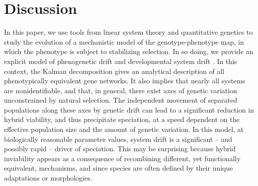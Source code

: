 \documentclass{article}
\newcommand{\1}{\mathbbm{1}}
\begin{document}
\section*{Discussion}


In this paper, we use tools from linear system theory and quantitative genetics
to study the evolution of a mechanistic model of the genotype-phenotype map, 
in which the phenotype is subject to stabilizing selection.
In so doing, we provide an explicit model of
phenogenetic drift \citep{weiss2000phenogenetic} and developmental system drift \citep{true2001developmental}.
In this context, the Kalman decomposition \citep{kalman1963mathematical}
gives an analytical description of all phenotypically equivalent gene networks.
It also implies that nearly all systems are nonidentifiable,
and that, in general, there exist axes of genetic variation unconstrained by natural selection.
The independent movement of separated populations along these axes by genetic drift
can lead to a significant reduction in hybrid viability, and thus precipitate speciation,
at a speed dependent on the effective population size and the amount of genetic variation. 
In this model, at biologically reasonable parameter values,
system drift is a significant -- and possibly rapid -- driver of speciation.
This may be surprising because
hybrid inviability appears as a consequence of recombining different, yet functionally equivalent, mechanisms, and since species are often defined by their unique adaptations or morphologies. 
\end{document}
